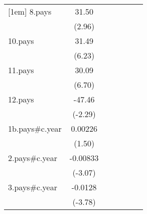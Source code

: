 {\begin{tabular}{l*{6}{c}}
[1em]
8.pays              &       31.50\sym{**} &                     &                     &                     &                     &                     \\
                    &      (2.96)         &                     &                     &                     &                     &                     \\
[1em]
10.pays             &       31.49\sym{***}&                     &                     &                     &                     &                     \\
                    &      (6.23)         &                     &                     &                     &                     &                     \\
[1em]
11.pays             &       30.09\sym{***}&                     &                     &                     &                     &                     \\
                    &      (6.70)         &                     &                     &                     &                     &                     \\
[1em]
12.pays             &      -47.46\sym{*}  &                     &                     &                     &                     &                     \\
                    &     (-2.29)         &                     &                     &                     &                     &                     \\
[1em]
1b.pays#c.year      &     0.00226         &                     &                     &                     &                     &                     \\
                    &      (1.50)         &                     &                     &                     &                     &                     \\
[1em]
2.pays#c.year       &    -0.00833\sym{**} &                     &                     &                     &                     &                     \\
                    &     (-3.07)         &                     &                     &                     &                     &                     \\
[1em]
3.pays#c.year       &     -0.0128\sym{***}&                     &                     &                     &                     &                     \\
                    &     (-3.78)         &                     &                     &                     &                     &                     \\

\end{tabular}}
